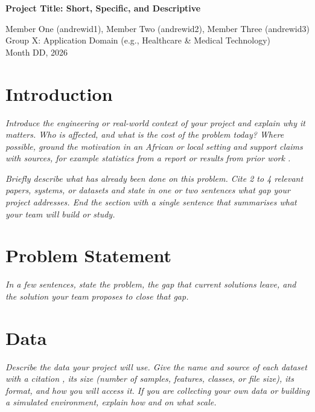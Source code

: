 \documentclass[11pt,a4paper]{article}
\newcommand{\guide}[1]{{\color{gray!85!black}\itshape #1}}
\begin{document}
\begin{center}
  {\LARGE\bfseries Project Title: Short, Specific, and Descriptive\par}
  \vspace{8pt}
  {\normalsize
  Member One (andrewid1), Member Two (andrewid2), Member Three (andrewid3)\\[3pt]
  Group X: Application Domain (e.g., Healthcare \& Medical Technology)\\[3pt]
  Month DD, 2026\par}
\end{center}
\vspace{4pt}

\section{Introduction}\label{sec:intro}
\guide{Introduce the engineering or real-world context of your project and explain why it matters. Who is affected, and what is the cost of the problem today? Where possible, ground the motivation in an African or local setting and support claims with sources, for example statistics from a report or results from prior work \cite{lecun2015deep}.}

\guide{Briefly describe what has already been done on this problem. Cite 2 to 4 relevant papers, systems, or datasets \cite{he2016deep, vaswani2017attention} and state in one or two sentences what gap your project addresses. End the section with a single sentence that summarises what your team will build or study.}

\section{Problem Statement}\label{sec:problem}
\guide{In a few sentences, state the problem, the gap that current solutions leave, and the solution your team proposes to close that gap.}

\section{Data}\label{sec:data}
\guide{Describe the data your project will use. Give the name and source of each dataset with a citation \cite{kermany2018identifying, uci_repository}, its size (number of samples, features, classes, or file size), its format, and how you will access it. If you are collecting your own data or building a simulated environment, explain how and on what scale.}
\end{document}
